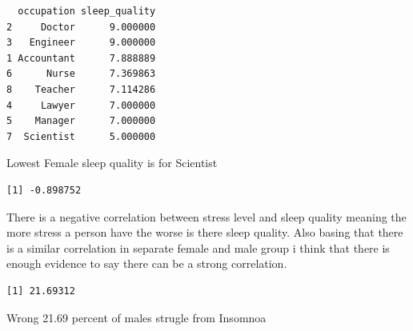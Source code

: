 \documentclass[
  letterpaper,
  DIV=11,
  numbers=noendperiod]{scrartcl}
\newenvironment{Shaded}{\begin{snugshade}}{\end{snugshade}}
\newcommand{\DecValTok}[1]{\textcolor[rgb]{0.68,0.00,0.00}{#1}}
\newcommand{\FunctionTok}[1]{\textcolor[rgb]{0.28,0.35,0.67}{#1}}
\newcommand{\NormalTok}[1]{\textcolor[rgb]{0.00,0.23,0.31}{#1}}
\newcommand{\OtherTok}[1]{\textcolor[rgb]{0.00,0.23,0.31}{#1}}
\newcommand{\SpecialCharTok}[1]{\textcolor[rgb]{0.37,0.37,0.37}{#1}}
\newcommand{\StringTok}[1]{\textcolor[rgb]{0.13,0.47,0.30}{#1}}
\begin{document}
\begin{verbatim}
  occupation sleep_quality
2     Doctor      9.000000
3   Engineer      9.000000
1 Accountant      7.888889
6      Nurse      7.369863
8    Teacher      7.114286
4     Lawyer      7.000000
5    Manager      7.000000
7  Scientist      5.000000
\end{verbatim}

Lowest Female sleep quality is for Scientist

\begin{Shaded}
\end{Shaded}

\begin{verbatim}
[1] -0.898752
\end{verbatim}

There is a negative correlation between stress level and sleep quality
meaning the more stress a person have the worse is there sleep quality.
Also basing that there is a similar correlation in separate female and
male group i think that there is enough evidence to say there can be a
strong correlation.

\begin{Shaded}
\end{Shaded}

\begin{verbatim}
[1] 21.69312
\end{verbatim}

Wrong 21.69 percent of males strugle from Insomnoa

\begin{Shaded}
\end{Shaded}
\end{document}
